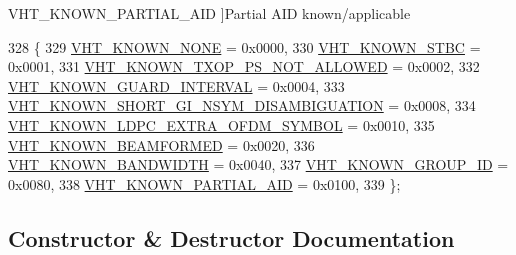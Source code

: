 \begin{Desc}
\begin{description}
{V\+H\+T\+\_\+\+K\+N\+O\+W\+N\+\_\+\+P\+A\+R\+T\+I\+A\+L\+\_\+\+A\+ID\hypertarget{classns3_1_1RadiotapHeader_a3479bfa57eb27bd6e5eeb2556ab8f5a8a9a64f65d00252ad386ce30035f22cfc7}{}\label{classns3_1_1RadiotapHeader_a3479bfa57eb27bd6e5eeb2556ab8f5a8a9a64f65d00252ad386ce30035f22cfc7}
}]Partial A\+ID known/applicable \end{description}
\end{Desc}

\begin{DoxyCode}
328   \{
329     \hyperlink{classns3_1_1RadiotapHeader_a3479bfa57eb27bd6e5eeb2556ab8f5a8a3fab8c5b84a45f60637048bcf0558753}{VHT\_KNOWN\_NONE}                         = 0x0000, 
330     \hyperlink{classns3_1_1RadiotapHeader_a3479bfa57eb27bd6e5eeb2556ab8f5a8a7d8adf3b395ad622e2ef6824ce609db7}{VHT\_KNOWN\_STBC}                         = 0x0001, 
331     \hyperlink{classns3_1_1RadiotapHeader_a3479bfa57eb27bd6e5eeb2556ab8f5a8afa3825ea52b1b830bc3685a60954b014}{VHT\_KNOWN\_TXOP\_PS\_NOT\_ALLOWED}          = 0x0002, 
332     \hyperlink{classns3_1_1RadiotapHeader_a3479bfa57eb27bd6e5eeb2556ab8f5a8a7fc9564ea0ad14f0f62001929f06d3e8}{VHT\_KNOWN\_GUARD\_INTERVAL}               = 0x0004, 
333     \hyperlink{classns3_1_1RadiotapHeader_a3479bfa57eb27bd6e5eeb2556ab8f5a8af20289c57eabeab3196761c256fff274}{VHT\_KNOWN\_SHORT\_GI\_NSYM\_DISAMBIGUATION} = 0x0008, 
334     \hyperlink{classns3_1_1RadiotapHeader_a3479bfa57eb27bd6e5eeb2556ab8f5a8a9555889f53c806a88c7559d47a637e48}{VHT\_KNOWN\_LDPC\_EXTRA\_OFDM\_SYMBOL}       = 0x0010, 
335     \hyperlink{classns3_1_1RadiotapHeader_a3479bfa57eb27bd6e5eeb2556ab8f5a8aee35ae1d0986b232b16c5085a351df43}{VHT\_KNOWN\_BEAMFORMED}                   = 0x0020, 
336     \hyperlink{classns3_1_1RadiotapHeader_a3479bfa57eb27bd6e5eeb2556ab8f5a8a740d1500b4e9c1df563f01392a4b7945}{VHT\_KNOWN\_BANDWIDTH}                    = 0x0040, 
337     \hyperlink{classns3_1_1RadiotapHeader_a3479bfa57eb27bd6e5eeb2556ab8f5a8a1d7df913d72c58e984d0f009cf54f731}{VHT\_KNOWN\_GROUP\_ID}                     = 0x0080, 
338     \hyperlink{classns3_1_1RadiotapHeader_a3479bfa57eb27bd6e5eeb2556ab8f5a8a9a64f65d00252ad386ce30035f22cfc7}{VHT\_KNOWN\_PARTIAL\_AID}                  = 0x0100, 
339   \};
\end{DoxyCode}


\subsection{Constructor \& Destructor Documentation}
